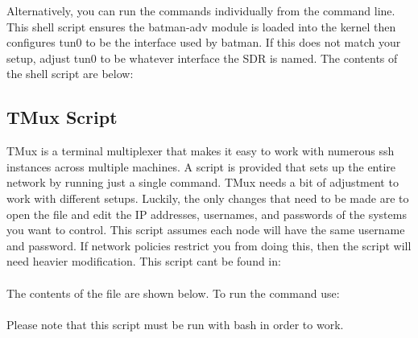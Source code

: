 Alternatively, you can run the commands individually from the command line. This shell script ensures the batman-adv module is loaded into the kernel then configures tun0 to be the interface used by batman. If this does not match your setup, adjust tun0 to be whatever interface the SDR is named. The contents of the shell script are below:



\subsection{TMux Script}

TMux is a terminal multiplexer that makes it easy to work with numerous ssh instances across multiple machines. A script is provided that sets up the entire network by running just a single command. TMux needs a bit of adjustment to work with different setups. Luckily, the only changes that need to be made are to open the file and edit the IP addresses, usernames, and passwords of the systems you want to control. This script assumes each node will have the same username and password. If network policies restrict you from doing this, then the script will need heavier modification. This script cant be found in: \\

 \\

The contents of the file are shown below. To run the command use: \\

 \\

Please note that this script must be run with bash in order to work. 

